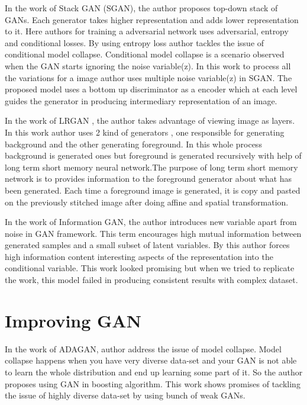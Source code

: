 In the work of Stack GAN (SGAN)\cite{stacked-gan}, the author proposes top-down stack of GANs. Each generator takes higher representation and adds lower representation to it. Here authors for training  a adversarial network uses adversarial, entropy and conditional losses. By using entropy loss author tackles the issue of conditional model collapse. Conditional model collapse  is a  scenario	observed	when	the	GAN	starts	ignoring the noise variable(z). In this work to process all the variations for a image author uses multiple noise variable(z) in SGAN. The proposed model uses a bottom up discriminator as a encoder which at each level guides the generator in producing intermediary representation of an image.

In the work of LRGAN \cite{LR-GAN}, the author takes advantage of viewing image as layers. In this work author uses 2 kind of generators , one responsible for generating background and the other generating foreground. In this whole process background is generated ones but foreground is generated recursively with help of long term short memory neural network\cite{hochreiter1997long}.The purpose of long term short memory network is to  provides information to the foreground generator about what has been generated. Each time a foreground image is generated, it is copy and pasted on the previously stitched image after doing affine and spatial transformation\cite{1506.02025}. 



In the work of Information GAN, the author introduces new variable apart from noise in GAN framework. This term encourages high mutual information between generated samples and a small subset of latent variables. By this author forces high information content interesting aspects of the representation into the conditional variable. This work looked promising but when we tried to replicate the work, this model failed in producing consistent results with complex dataset.


\section{Improving GAN}

In the work of ADAGAN, author address the issue of model collapse. Model collapse happens when you have very diverse data-set and your GAN is not able to learn the whole distribution and end up learning some part of it. So the author proposes using GAN in boosting algorithm. This work shows promises of tackling the issue of highly diverse data-set by using bunch of weak GANs.
\par

